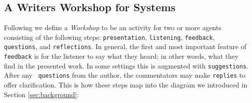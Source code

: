 \subsection{A Writers Workshop for Systems} \label{sec:ww}





Following 
we define a \emph{Workshop} to be an activity for two or more agents
consisting of the following steps:
{\tt presentation}, {\tt listening}, {\tt feedback}, {\tt questions},
and {\tt reflections}.  In general, the first and most important
feature of {\tt feedback} is for the listener to say what they heard;
in other words, what they find in the presented work.  In some
settings this is augmented with {\tt suggestions}.  After any {\tt
  questions} from the author, the commentators may make {\tt replies}
to offer clarification.  This is how these steps map into the diagram
we introduced in Section \ref{sec:background}:


